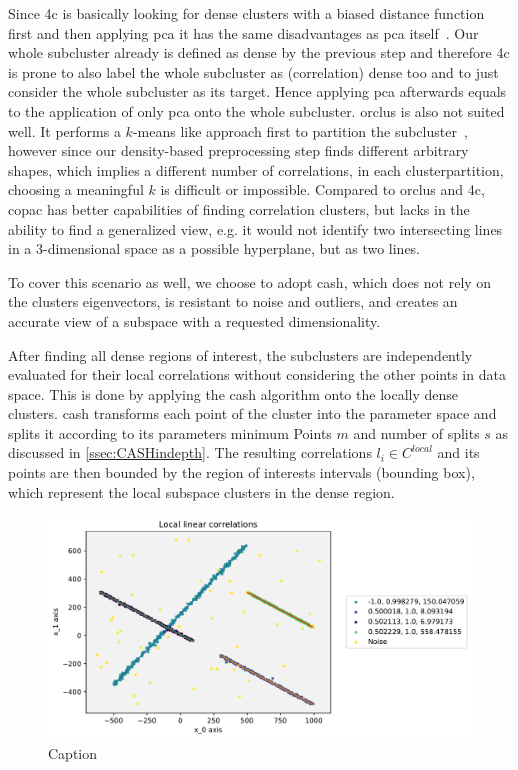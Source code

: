 Since \gls{4c} is basically looking for dense clusters with a biased distance function first and then applying \gls{pca} it has the same disadvantages as \gls{pca} itself~\cite{4cbohm2004computing}. Our whole subcluster already is defined as dense by the previous step and therefore \gls{4c} is prone to also label the whole subcluster as (correlation) dense too and to just consider the whole subcluster as its target. Hence applying \gls{pca} afterwards equals to the application of only \gls{pca} onto the whole subcluster. 
\gls{orclus} is also not suited well. It performs a $k$-means like approach first to partition the subcluster~\cite{orclusaggarwal2000finding}, however since our density-based preprocessing step finds different arbitrary shapes, which implies a different number of correlations, in each clusterpartition, choosing a meaningful $k$ is difficult or impossible. 
Compared to \gls{orclus} and \gls{4c}, \gls{copac} has better capabilities of finding correlation clusters, but lacks in the ability to find a generalized view, e.g. it would not identify two intersecting lines in a 3-dimensional space as a possible hyperplane, but as two lines. 

To cover this scenario as well, we choose to adopt \gls{cash}, which does not rely on the clusters eigenvectors, is resistant to noise and outliers, and creates an accurate view of a subspace with a requested dimensionality.

After finding all dense regions of interest, the subclusters are independently evaluated for their local correlations without considering the other points in data space. This is done by applying the \gls{cash} algorithm onto the locally dense clusters. \gls{cash} transforms each point of the cluster into the parameter space and splits it according to its parameters minimum Points $m$ and number of splits $s$ as discussed in \autoref{ssec:CASHindepth}. The resulting correlations $l_i \in C^{local}$ and its points are then bounded by the region of interests intervals (bounding box), which represent the local subspace clusters in the dense region.

\begin{figure}
    \centering
    \includegraphics[width=.6\textwidth]{figures_method/LocalLinearCorrelationsWithCorrs.pdf}
    \caption{Caption}
    \label{fig:my_label}
\end{figure}

